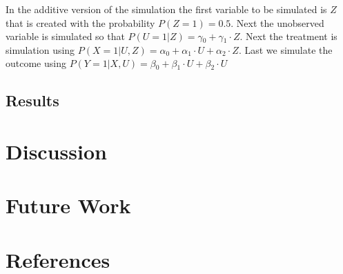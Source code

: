 \documentclass{article}
\begin{document}
In the additive version of the simulation the first variable to be simulated is $Z$ that is created with the probability $P(Z=1)=0.5$.
Next the unobserved variable is simulated so that $P(U=1|Z)=\gamma{}_0 + \gamma{}_1\cdot{}Z$. Next the treatment is simulation using $P(X=1|U,Z) = \alpha{}_0 + \alpha{}_1 \cdot{} U + \alpha{}_2 \cdot{} Z$. Last we simulate the outcome using $P(Y=1|X,U) = \beta{}_0 + \beta{}_1 \cdot{} U + \beta{}_2 \cdot{} U$

\subsection{Results}


\section{Discussion}

\section{Future Work}

\section{References}



\end{document}
